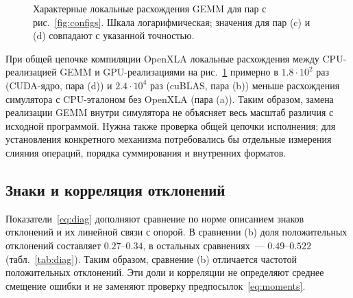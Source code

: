 \begin{figure}[htbp]
    \centering
    \caption{Характерные локальные расхождения GEMM для пар с рис.~\ref{fig:configs}.
        Шкала логарифмическая; значения для пар (c) и (d) совпадают
        с указанной точностью.}
    \label{fig:hierarchy}
\end{figure}

При общей цепочке компиляции OpenXLA локальные расхождения
между CPU-реализацией GEMM и GPU-реализациями
на рис.~\ref{fig:hierarchy} примерно в $1.8\cdot10^2$ раз
(CUDA-ядро, пара (d)) и $2.4\cdot10^4$ раз (cuBLAS, пара (b))
меньше расхождения симулятора с CPU-эталоном без OpenXLA (пара (a)). Таким образом, замена реализации
GEMM внутри симулятора
не объясняет весь масштаб различия с исходной программой.
Нужна также проверка общей цепочки исполнения; для установления
конкретного механизма потребовались бы отдельные измерения
слияния операций, порядка суммирования и внутренних форматов.

\subsection{Знаки и корреляция отклонений}

Показатели~\eqref{eq:diag} дополняют сравнение по норме описанием
знаков отклонений и их линейной связи с опорой.
В сравнении (b) доля положительных отклонений составляет $0.27$--$0.34$,
в остальных сравнениях~--- $0.49$--$0.522$ (табл.~\ref{tab:diag}).
Таким образом, сравнение (b) отличается частотой положительных отклонений.
Эти доли и корреляции не определяют среднее смещение ошибки
и не заменяют проверку предпосылок~\eqref{eq:moments}.

